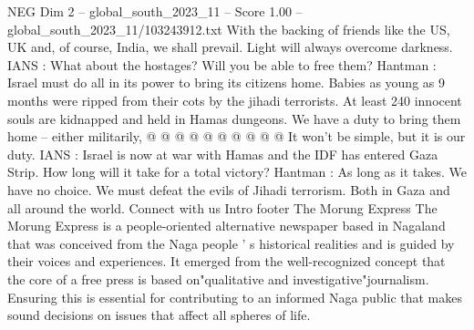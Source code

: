 \begin{textsample}{NEG Dim 2 – global\_south\_2023\_11 – Score 1.00 – global\_south\_2023\_11/103243912.txt}
With the backing of friends like the US, UK and, of course, India, we shall prevail.
Light will always overcome darkness.
IANS : What about the hostages?
Will you be able to free them?
Hantman : Israel must do all in its power to bring its citizens home.
Babies as young as 9 months were ripped from their cots by the jihadi terrorists.
At least 240 innocent souls are kidnapped and held in Hamas dungeons.
We have a duty to bring them home -- either militarily, @ @ @ @ @ @ @ @ @ @ It won't be simple, but it is our duty.
IANS : Israel is now at war with Hamas and the IDF has entered Gaza Strip.
How long will it take for a total victory?
Hantman : As long as it takes.
We have no choice.
We must defeat the evils of Jihadi terrorism.
Both in Gaza and all around the world.
Connect with us Intro footer The Morung Express The Morung Express is a people-oriented alternative newspaper based in Nagaland that was conceived from the Naga people ' s historical realities and is guided by their voices and experiences.
It emerged from the well-recognized concept that the core of a free press is based on"qualitative and investigative"journalism.
Ensuring this is essential for contributing to an informed Naga public that makes sound decisions on issues that affect all spheres of life.

\end{textsample}
